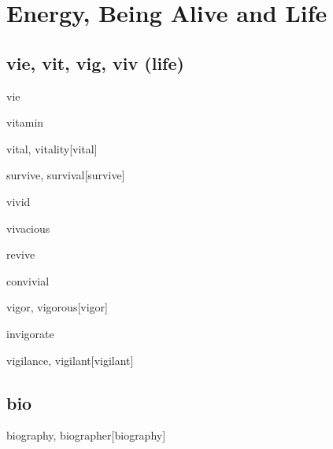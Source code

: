 \chapter{Energy, Being Alive and Life}

\section{vie, vit, vig, viv (life)}

\begin{RefWord}{vie}
\end{RefWord}

\begin{RefWord}{vitamin}
\end{RefWord}

\begin{RefWord}{vital, vitality}[vital]
\end{RefWord}

\begin{RefWord}{survive, survival}[survive]
\end{RefWord}

\begin{RefWord}{vivid}
\end{RefWord}

\begin{RefWord}{vivacious}
\end{RefWord}

\begin{RefWord}{revive}
\end{RefWord}

\begin{RefWord}{convivial}
\end{RefWord}

\begin{RefWord}{vigor, vigorous}[vigor]
\end{RefWord}

\begin{RefWord}{invigorate}
\end{RefWord}

\begin{RefWord}{vigilance, vigilant}[vigilant]
\end{RefWord}

\section{bio}

\begin{RefWord}{biography, biographer}[biography]
\end{RefWord}

